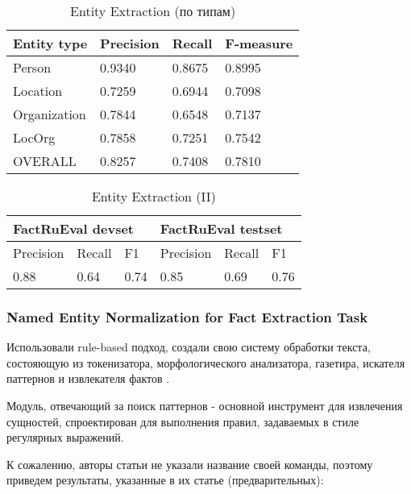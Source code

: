 \begin{table}[ht]
\centering
\caption{Entity Extraction (по типам)}
\label{factrueval_1_2}
\begin{tabular}{|l|l|l|l|}
\hline
Entity type         & Precision & Recall & F-measure     \\ \hline
Person       & 0.9340    & 0.8675 & 0.8995 \\ \hline
Location     & 0.7259    & 0.6944 & 0.7098 \\ \hline
Organization & 0.7844    & 0.6548 & 0.7137 \\ \hline
LocOrg       & 0.7858    & 0.7251 & 0.7542 \\ \hline
OVERALL      & 0.8257    & 0.7408 & 0.7810 \\ \hline
\end{tabular}
\end{table}



\begin{table}[ht]
\centering
\caption{Entity Extraction (II)}
\label{factrueval_1_3}
\begin{tabular}{|l|l|l|l|l|l|}
\hline
\multicolumn{3}{|l|}{FactRuEval devset} & \multicolumn{3}{l|}{FactRuEval testset} \\ \hline
Precision     & Recall     & F1         & Precision     & Recall     & F1         \\ \hline
0.88        & 0.64    & 0.74     & 0.85        & 0.69     & 0.76     \\ \hline
\end{tabular}
\end{table}

\subsubsection{Named Entity Normalization for Fact Extraction Task}

Использовали rule-based подход, создали свою систему обработки текста, состояющую из токенизатора, морфологического анализатора, газетира, искателя паттернов и извлекателя фактов \cite{FactRuEval2}. 

Модуль, отвечающий за поиск паттернов - основной инструмент для извлечения сущностей, спроектирован для выполнения правил, задаваемых в стиле регулярных выражений.

К сожалению, авторы статьи не указали название своей команды, поэтому приведем результаты, указанные в их статье (предварительных):

